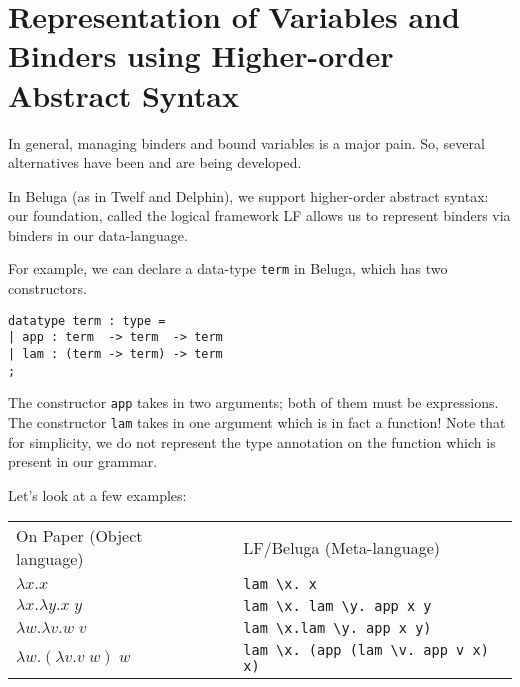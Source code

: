 \section{Representation of Variables and Binders using Higher-order Abstract Syntax} 
In general, managing binders and bound variables is a major pain. So,
several alternatives have been and are being developed.

In Beluga (as in Twelf and Delphin), we support higher-order abstract syntax: our foundation, called the logical framework LF \cite{Harper93jacm} allows us to represent binders via binders in our data-language.

For example, we can declare a data-type \lstinline!term! in Beluga,
which has two constructors.

\begin{lstlisting}
datatype term : type = 
| app : term  -> term  -> term
| lam : (term -> term) -> term
;
\end{lstlisting}

The constructor \lstinline!app! takes in two arguments; both of them
must be expressions. The constructor \lstinline!lam! takes in one
argument which is in fact a function! Note that for simplicity, we do
not represent the type annotation on the function which is present in
our grammar. 

Let's look at a few examples:




\begin{center}
  \begin{tabular}{lp{0.25cm}l}
On Paper (Object language)     & & LF/Beluga (Meta-language)\\
$\lambda x.x$ & & \lstinline!lam \x. x! \\    
$\lambda x.\lambda y. x\;y$ & &
\lstinline!lam \x. lam \y. app x y! \\
$\lambda w.\lambda v. w\;v$ & &
\lstinline!lam \x.lam \y. app x y)! \\
$\lambda w. (\lambda v. v\;w) \;w$
&& \lstinline!lam \x. (app (lam \v. app v x) x)!
  \end{tabular}
\end{center}


